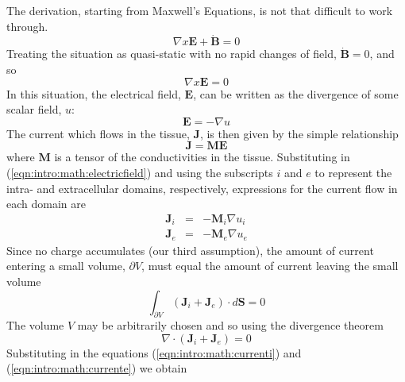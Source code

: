 The derivation, starting from Maxwell's Equations, is not that difficult to work
through.
\begin{equation}
\label{eqn:intro:math:maxwell}
\nabla x \mathbf{E} + \mathbf{\dot{B}} = 0
\end{equation}
Treating the situation as quasi-static with no rapid changes of field, $\mathbf{\dot{B}} = 0$, and so
\begin{equation}
\label{eqn:intro:math:maxwellqs}
\nabla x \mathbf{E} = 0
\end{equation}
In this situation, the electrical field, $\mathbf{E}$, can be written as the
divergence of some scalar field, $u$:
\begin{equation}
\label{eqn:intro:math:electricfield}
\mathbf{E} = - \nabla u
\end{equation}
The current which flows in the tissue, $\mathbf{J}$, is then given by the simple
relationship
\begin{equation}
\label{eqn:intro:math:current}
\mathbf{J} = \mathbf{M} \mathbf{E}
\end{equation}
where $\mathbf{M}$ is a tensor of the conductivities in the tissue.
Substituting in (\ref{eqn:intro:math:electricfield}) and using the subscripts
$i$ and $e$ to represent the intra- and extracellular domains, respectively,
expressions for the current flow in each domain are
\begin{subequations}
\label{eqn:intro:math:currentsubs}
\begin{align}
\mathbf{J}_i &=& - \mathbf{M}_i \nabla u_i
\label{eqn:intro:math:currenti}\\
\mathbf{J}_e &=& - \mathbf{M}_e \nabla u_e
\label{eqn:intro:math:currente}
\end{align}
\end{subequations}
Since no charge accumulates (our third assumption), the amount of current
entering a small volume, $\partial V$, must equal the amount of current leaving
the small volume
\begin{equation}
\label{eqn:intro:math:currentvolumeinteg}
\int_{\partial V} \left(\mathbf{J}_i + \mathbf{J}_e\right) \cdot d\mathbf{S} = 0
\end{equation}
The volume $V$ may be arbitrarily chosen and so using the divergence theorem
\begin{equation}
\label{eqn:intro:math:currentdiv}
\nabla \cdot \left(\mathbf{J}_i + \mathbf{J}_e\right) = 0
\end{equation}
Substituting in the equations (\ref{eqn:intro:math:currenti}) and
(\ref{eqn:intro:math:currente}) we obtain
